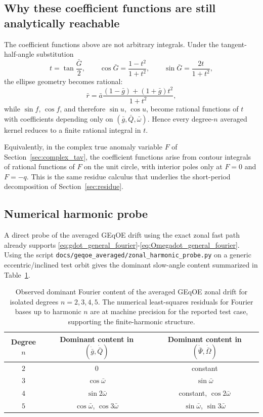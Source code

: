 \documentclass[11pt]{article}
\begin{document}
\subsection{Why these coefficient functions are still analytically reachable}

The coefficient functions above are not arbitrary integrals. Under the
tangent-half-angle substitution
\begin{equation}
t = \tan\frac{\bar G}{2},
\qquad
\cos\bar G = \frac{1-t^2}{1+t^2},
\qquad
\sin\bar G = \frac{2t}{1+t^2},
\end{equation}
the ellipse geometry becomes rational:
\begin{equation}
\bar r
= \bar a\frac{(1-\bar g)+(1+\bar g)t^2}{1+t^2},
\end{equation}
while $\sin f$, $\cos f$, and therefore $\sin u$, $\cos u$, become rational
functions of $t$ with coefficients depending only on
$(\bar g,\bar Q,\bar\omega)$. Hence every degree-$n$ averaged kernel reduces to
a finite rational integral in $t$.

Equivalently, in the complex true anomaly variable $F$ of
Section~\ref{sec:complex_tav}, the coefficient functions arise from contour
integrals of rational functions of $F$ on the unit circle, with interior
poles only at $F = 0$ and $F = -q$. This is the same
residue calculus that underlies the short-period decomposition of
Section~\ref{sec:residue}.

\subsection{Numerical harmonic probe}

A direct probe of the averaged GEqOE drift using the exact zonal fast path
already supports \eqref{eq:gdot_general_fourier}-\eqref{eq:Omegadot_general_fourier}.
Using the script
\texttt{docs/geqoe\_averaged/zonal\_harmonic\_probe.py} on a generic
eccentric/inclined test orbit gives the dominant slow-angle content summarized in
Table~\ref{tab:zonal_harmonic_probe}.

\begin{table}[ht]
\centering
\begin{tabular}{@{}ccc@{}}
\toprule
Degree $n$ & Dominant content in $(\dot{\bar g},\dot{\bar Q})$ & Dominant content in $(\dot{\bar\Psi},\dot{\bar\Omega})$ \\
\midrule
$2$ & $0$ & constant \\
$3$ & $\cos\bar\omega$ & $\sin\bar\omega$ \\
$4$ & $\sin 2\bar\omega$ & constant, $\cos 2\bar\omega$ \\
$5$ & $\cos\bar\omega$, $\cos 3\bar\omega$ & $\sin\bar\omega$, $\sin 3\bar\omega$ \\
\bottomrule
\end{tabular}
\caption{Observed dominant Fourier content of the averaged GEqOE zonal drift for isolated degrees $n=2,3,4,5$. The numerical least-squares residuals for Fourier bases up to harmonic $n$ are at machine precision for the reported test case, supporting the finite-harmonic structure.}
\label{tab:zonal_harmonic_probe}
\end{table}
\end{document}
